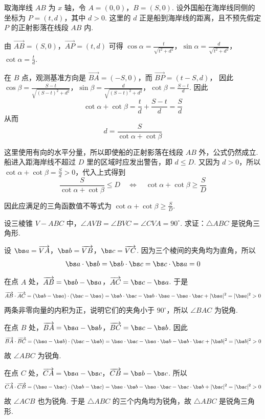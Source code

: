 \begin{solution}
取海岸线 \(AB\) 为 \(x\) 轴，令
\(A=(0,0)\)，\(B=(S,0)\).
设外国船在海岸线同侧的坐标为 \(P=(t,d)\)，其中 \(d>0\).
这里的 \(d\) 正是船到海岸线的距离，且不预先假定 \(P\) 的正射影落在线段 \(AB\) 内.

由 \(\overrightarrow{AB}=(S,0)\)，\(\overrightarrow{AP}=(t,d)\) 可得
\(\cos\alpha=\frac{t}{\sqrt{t^2+d^2}}\)，\(\sin\alpha=\frac{d}{\sqrt{t^2+d^2}}\)，\(\cot\alpha=\frac{t}{d}\).

在 \(B\) 点，观测基准方向是 \(\overrightarrow{BA}=(-S,0)\)，而
\(
 \overrightarrow{BP}=(t-S,d)
\)，
因此
\(\cos\beta=\frac{S-t}{\sqrt{(S-t)^2+d^2}}\)，\(\sin\beta=\frac{d}{\sqrt{(S-t)^2+d^2}}\)，\(\cot\beta=\frac{S-t}{d}\).
因此
\[
\cot\alpha+\cot\beta
=\frac{t}{d}+\frac{S-t}{d}
=\frac{S}{d}
\]
从而
\[
d=\frac{S}{\cot\alpha+\cot\beta}
\]

这里使用有向的水平分量，所以即使船的正射影落在线段 \(AB\) 外，公式仍然成立. 船进入距海岸线不超过 \(D\) 里的区域时应发出警告，即 \(d\leq D\). 又因为 \(d>0\)，所以 \(\cot\alpha+\cot\beta=\frac{S}{d}>0\)，代入上式得到
\[
\frac{S}{\cot\alpha+\cot\beta}\leq D
\quad\Longleftrightarrow\quad
\cot\alpha+\cot\beta\geq\frac{S}{D}
\]

因此应满足的三角函数值不等式为
\(
\cot\alpha+\cot\beta\geq\frac{S}{D}
\).
\end{solution}

\begin{problem}
设三棱锥 \(V - ABC\) 中，\(\angle AVB = \angle BVC = \angle CVA = 90^{\circ}\). 求证：\(\triangle ABC\) 是锐角三角形.
\end{problem}

\begin{solution}
设 \(\bs a=\overrightarrow{VA}\)，\(\bs b=\overrightarrow{VB}\)，\(\bs c=\overrightarrow{VC}\).
因为三个棱间的夹角均为直角，所以
\[
\bs a\cdot\bs b=\bs b\cdot\bs c=\bs c\cdot\bs a=0
\]

在点 \(A\) 处，\(\overrightarrow{AB}=\bs b-\bs a\)，\(\overrightarrow{AC}=\bs c-\bs a\).
于是
\[
\overrightarrow{AB}\cdot\overrightarrow{AC}
=(\bs b-\bs a)\cdot(\bs c-\bs a)
=\bs b\cdot\bs c-\bs b\cdot\bs a-\bs a\cdot\bs c+\lvert\bs a\rvert^2
=\lvert\bs a\rvert^2>0
\]
两条非零向量的内积为正，说明它们的夹角小于 \(90^{\circ}\)，所以 \(\angle BAC\) 为锐角.

在点 \(B\) 处，\(\overrightarrow{BA}=\bs a-\bs b\)，\(\overrightarrow{BC}=\bs c-\bs b\).
因此
\[
\overrightarrow{BA}\cdot\overrightarrow{BC}
=(\bs a-\bs b)\cdot(\bs c-\bs b)
=\bs a\cdot\bs c-\bs a\cdot\bs b-\bs b\cdot\bs c+\lvert\bs b\rvert^2
=\lvert\bs b\rvert^2>0
\]
故 \(\angle ABC\) 为锐角.

在点 \(C\) 处，\(\overrightarrow{CA}=\bs a-\bs c\)，\(\overrightarrow{CB}=\bs b-\bs c\).
所以
\[
\overrightarrow{CA}\cdot\overrightarrow{CB}
=(\bs a-\bs c)\cdot(\bs b-\bs c)
=\bs a\cdot\bs b-\bs a\cdot\bs c-\bs c\cdot\bs b+\lvert\bs c\rvert^2
=\lvert\bs c\rvert^2>0
\]
故 \(\angle ACB\) 也为锐角. 于是 \(\triangle ABC\) 的三个内角均为锐角，故 \(\triangle ABC\) 是锐角三角形.
\end{solution}


